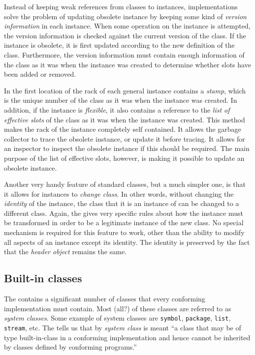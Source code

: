 Instead of keeping weak references from classes to instances,
implementations solve the problem of updating obsolete instance by
keeping some kind of \emph{version information} in each instance.
When some operation on the instance is attempted, the version
information is checked against the current version of the class.  If
the instance is obsolete, it is first updated according to the new
definition of the class.  Furthermore, the version information must
contain enough information of the class as it was when the instance
was created to determine whether slots have been added or removed.

In \sysname{} the first location of the rack of each
general instance contains a \emph{stamp}, which is the unique number
of the class as it was when the instance was created.  In addition,
if the instance is \emph{flexible}, it also contains a reference to the
\emph{list of effective slots} of the class as it was when the
instance was created.  This method makes the rack of the
instance completely self contained.  It allows the garbage collector
to trace the obsolete instance, or update it before tracing.  It
allows for an inspector to inspect the obsolete instance if this
should be required.  The main purpose of the list of effective slots,
however, is making it possible to update an obsolete instance.

Another very handy feature of standard classes, but a much simpler
one, is that it allows for instances to \emph{change class}.  In other
words, without changing the \emph{identity} of the instance, the class
that it is an instance of can be changed to a different class.  Again,
the \hs{} gives very specific rules about how the instance must be
transformed in order to be a legitimate instance of the new class.  No
special mechanism is required for this feature to work, other than the
ability to modify all aspects of an instance except its identity.  The
identity is preserved by the fact that the \emph{header object}
remains the same. 

\subsection{Built-in classes}
\label{object-system-built-in-classes}

The \hs{} contains a significant number of classes that every
conforming implementation must contain.  Most (all?) of these classes
are referred to as \emph{system classes}.  Some example of system
classes are \texttt{symbol}, \texttt{package}, \texttt{list},
\texttt{stream}, etc.  The \hs{} tells us that by \emph{system
  class} is meant ``a class that may be of type built-in-class in a
conforming implementation and hence cannot be inherited by classes
defined by conforming programs.'' 

